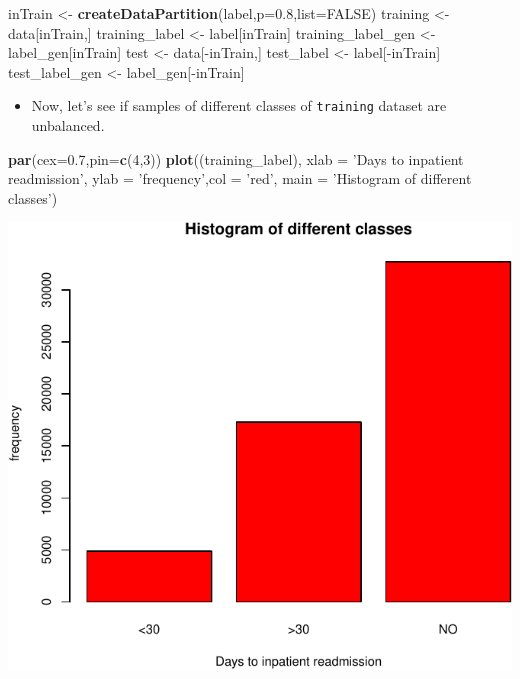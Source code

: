 \documentclass[]{article}
\newenvironment{Shaded}{\begin{snugshade}}{\end{snugshade}}
\newcommand{\KeywordTok}[1]{\textcolor[rgb]{0.13,0.29,0.53}{\textbf{{#1}}}}
\newcommand{\DataTypeTok}[1]{\textcolor[rgb]{0.13,0.29,0.53}{{#1}}}
\newcommand{\DecValTok}[1]{\textcolor[rgb]{0.00,0.00,0.81}{{#1}}}
\newcommand{\FloatTok}[1]{\textcolor[rgb]{0.00,0.00,0.81}{{#1}}}
\newcommand{\StringTok}[1]{\textcolor[rgb]{0.31,0.60,0.02}{{#1}}}
\newcommand{\OtherTok}[1]{\textcolor[rgb]{0.56,0.35,0.01}{{#1}}}
\newcommand{\NormalTok}[1]{{#1}}
\begin{document}
\begin{Shaded}
\begin{Highlighting}[]
\NormalTok{inTrain <-}\StringTok{ }\KeywordTok{createDataPartition}\NormalTok{(label,}\DataTypeTok{p=}\FloatTok{0.8}\NormalTok{,}\DataTypeTok{list=}\OtherTok{FALSE}\NormalTok{)}
\NormalTok{training <-}\StringTok{ }\NormalTok{data[inTrain,]}
\NormalTok{training_label <-}\StringTok{ }\NormalTok{label[inTrain]}
\NormalTok{training_label_gen <-}\StringTok{ }\NormalTok{label_gen[inTrain]}
\NormalTok{test <-}\StringTok{ }\NormalTok{data[-inTrain,]}
\NormalTok{test_label <-}\StringTok{ }\NormalTok{label[-inTrain]}
\NormalTok{test_label_gen <-}\StringTok{ }\NormalTok{label_gen[-inTrain]}
\end{Highlighting}
\end{Shaded}

\begin{itemize}
\itemsep1pt\parskip0pt
\item
  Now, let's see if samples of different classes of \texttt{training}
  dataset are unbalanced.
\end{itemize}

\begin{Shaded}
\begin{Highlighting}[]
\KeywordTok{par}\NormalTok{(}\DataTypeTok{cex=}\FloatTok{0.7}\NormalTok{,}\DataTypeTok{pin=}\KeywordTok{c}\NormalTok{(}\DecValTok{4}\NormalTok{,}\DecValTok{3}\NormalTok{))}
\KeywordTok{plot}\NormalTok{((training_label), }\DataTypeTok{xlab =} \StringTok{'Days to inpatient readmission'}\NormalTok{, }\DataTypeTok{ylab =} \StringTok{'frequency'}\NormalTok{,}\DataTypeTok{col =} \StringTok{'red'}\NormalTok{, }\DataTypeTok{main =} \StringTok{'Histogram of different classes'}\NormalTok{)}
\end{Highlighting}
\end{Shaded}

\includegraphics{Project_files/figure-latex/Preprocessing_classtype-1.pdf}
\end{document}
